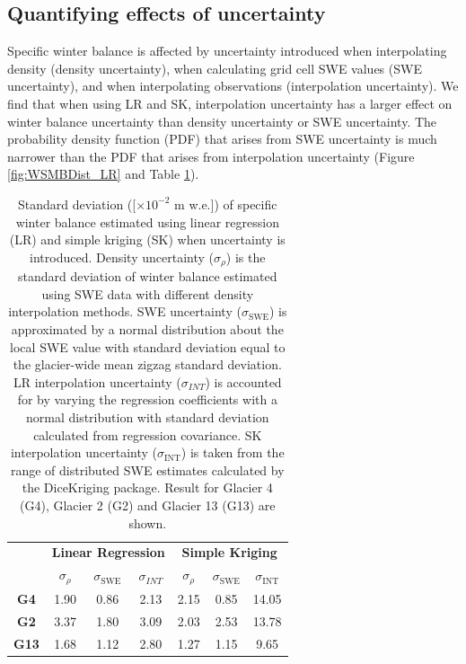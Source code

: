 \documentclass[review,oneside, letterpaper]{igs}
\begin{document}
\subsection{Quantifying effects of uncertainty}

Specific winter balance is affected by uncertainty introduced when interpolating density (density uncertainty), when calculating grid cell SWE values (SWE uncertainty), and when interpolating observations (interpolation uncertainty). We find that when using LR and SK, interpolation uncertainty has a larger effect on winter balance uncertainty than density uncertainty or SWE uncertainty. The probability density function (PDF) that arises from SWE uncertainty is much narrower than the PDF that arises from interpolation uncertainty (Figure \ref{fig:WSMBDist_LR} and Table \ref{tab:WSMBdistribution_sigma}).

 \begin{table}[]
\centering
\caption{Standard deviation ([$\times10^{-2}$ m w.e.]) of specific winter balance estimated using linear regression (LR) and simple kriging (SK) when uncertainty is introduced. Density uncertainty ($\sigma_{\rho}$) is the standard deviation of winter balance estimated using SWE data with different density interpolation methods. SWE uncertainty ($\sigma_{\mathrm{SWE}}$) is approximated by a normal distribution about the local SWE value with standard deviation equal to the glacier-wide mean zigzag standard deviation. LR interpolation uncertainty ($\sigma_{INT}$) is accounted for by varying the regression coefficients with a normal distribution with standard deviation calculated from regression covariance. SK interpolation uncertainty ($\sigma_{\mathrm{INT}}$) is taken from the range of distributed SWE estimates calculated by the DiceKriging package. Result for Glacier 4 (G4), Glacier 2 (G2) and Glacier 13 (G13) are shown.}
\label{tab:WSMBdistribution_sigma}
\begin{tabular}{ccccccc}
\textbf{} & \multicolumn{3}{c}{\textbf{Linear Regression}} & \multicolumn{3}{c}{\textbf{Simple Kriging}} \\
 & $\sigma_{\rho}$ & $\sigma_{\mathrm{SWE}}$ & $\sigma_{INT}$ & $\sigma_{\rho}$ & $\sigma_{\mathrm{SWE}}$ & $\sigma_{\mathrm{INT}}$ \\
\midrule
\textbf{G4} & 1.90 & 0.86 & 2.13 & 2.15 & 0.85 & 14.05 \\
\textbf{G2} &3.37 & 1.80 & 3.09 & 2.03 & 2.53 & 13.78 \\
\textbf{G13} & 1.68 & 1.12 & 2.80 & 1.27 & 1.15 & 9.65
\end{tabular}
\end{table}
\end{document}
